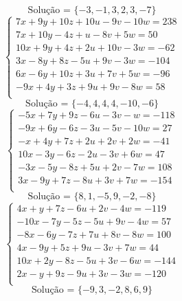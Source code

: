 \documentclass[12pt,oneside,a4paper]{article}
\begin{document}
\begin{equation*}
\text{Solução = }\{-3,-1,3,2,3,-7\}
\end{equation*}
\vspace{\baselineskip}
\begin{equation*}
\begin{cases}
7x+9y+10z+10u-9v-10w=238 \\
7x+10y-4z+u-8v+5w=50 \\
10x+9y+4z+2u+10v-3w=-62 \\
3x-8y+8z-5u+9v-3w=-104 \\
6x-6y+10z+3u+7v+5w=-96 \\
-9x+4y+3z+9u+9v-8w=58 \\
\end{cases}
\end{equation*}
\begin{equation*}
\text{Solução = }\{-4,4,4,4,-10,-6\}
\end{equation*}
\vspace{\baselineskip}
\begin{equation*}
\begin{cases}
-5x+7y+9z-6u-3v-w=-118 \\
-9x+6y-6z-3u-5v-10w=27 \\
-x+4y+7z+2u+2v+2w=-41 \\
10x-3y-6z-2u-3v+6w=47 \\
-3x-5y-8z+5u+2v-7w=108 \\
3x-9y+7z-8u+3v+7w=-154 \\
\end{cases}
\end{equation*}
\begin{equation*}
\text{Solução = }\{8,1,-5,9,-2,-8\}
\end{equation*}
\vspace{\baselineskip}
\begin{equation*}
\begin{cases}
4x+y+7z-6u+2v-4w=-119 \\
-10x-7y-5z-5u+9v-4w=57 \\
-8x-6y-7z+7u+8v-8w=100 \\
4x-9y+5z+9u-3v+7w=44 \\
10x+2y-8z-5u+3v-6w=-144 \\
2x-y+9z-9u+3v-3w=-120 \\
\end{cases}
\end{equation*}
\begin{equation*}
\text{Solução = }\{-9,3,-2,8,6,9\}
\end{equation*}
\end{document}
